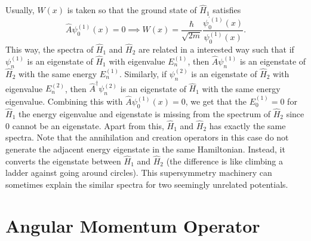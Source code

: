\documentclass{article}
\theoremstyle{nonumberplain}
\begin{document}
Usually, $W(x)$ is taken so that the ground state of $\hat{H} _1$ satisfies 
\[
    \hat{A} \psi_0^{(1)} (x) =0 \implies 
    W(x) = \frac{\hbar }{\sqrt{2m} } \frac{\psi_0^{^\prime (1)}(x)}{ \psi_0^{(1)}(x)}. 
\]
This way, the spectra of $\hat{H} _1$ and $\hat{H} _2$ are related in a interested way such that if $\psi_n^{(1)}$ is an eigenstate of $\hat{H} _1$ with eigenvalue $E_n^{(1)}$, then $\hat{A} \psi_n^{(1)}$ is an eigenstate of $\hat{H} _2$ with the same energy $E_n^{(1)}$. Similarly, if $\psi_n^{(2)}$ is an eigenstate of $\hat{H} _2$ with eigenvalue $E_n^{(2)}$, then $\hat{A} ^{\dagger} \psi_n^{(2)}$ is an eigenstate of $\hat{H} _1$ with the same energy eigenvalue. Combining this with $\hat{A} \psi_0^{(1)} (x) =0$, we get that the $E_0^{(1)} = 0 $ for $\hat{H} _1$ \textemdash the energy eigenvalue and eigenstate is missing from the spectrum of $\hat{H}_2$ since $0$ cannot be an eigenstate. Apart from this, $\hat{H}_1$ and $\hat{H} _2$ has exactly the same spectra. Note that the annihilation and creation operators in this case do not generate the adjacent energy eigenstate in the same Hamiltonian. Instead, it converts the eigenstate between $\hat{H} _1$ and $\hat{H} _2$ (the difference is like climbing a ladder against going around circles).
This supersymmetry machinery can sometimes explain the similar spectra for two seemingly unrelated potentials. 

\section{Angular Momentum Operator}
\end{document}
